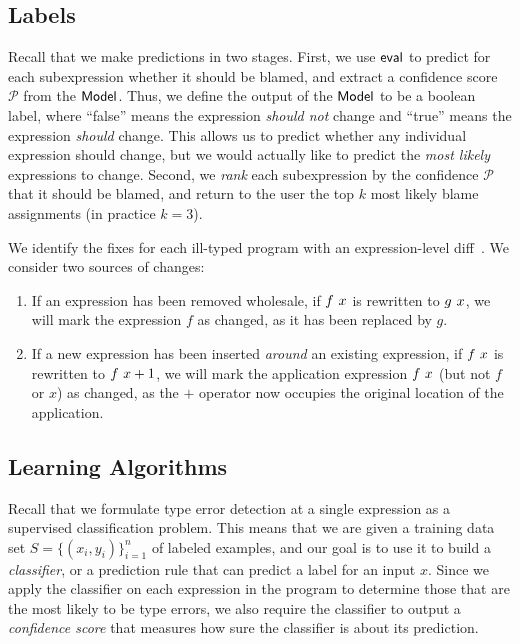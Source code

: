 \subsection{Labels}
\label{sec:labels}
Recall that we make predictions in two stages.
%
First, we use $\mathsf{eval}$ to predict for each subexpression whether it
should be blamed, and extract a confidence score $\mathcal{P}$ from the
$\mathsf{Model}$.
%
Thus, we define the output of the $\mathsf{Model}$ to be a boolean label, where
``false'' means the expression \emph{should not} change and ``true''
means the expression \emph{should} change.
%
This allows us to predict whether any individual expression should
change, but we would actually like to predict the \emph{most likely}
expressions to change.
%
Second, we \emph{rank} each subexpression by the confidence $\mathcal{P}$
that it should be blamed, and return to the user the top $k$
most likely blame assignments (in practice $k=3$).


We identify the fixes for each ill-typed program with an
expression-level diff~\citep{Lempsink2009-xf}.
%
We consider two sources of changes:
%
\begin{enumerate}
\item If an expression has been removed wholesale, \eg if $f\ x$
  is rewritten to $g\ x$, we will mark the expression $f$ as
  changed, as it has been replaced by $g$.
\item If a new expression has been inserted \emph{around} an existing
  expression, \eg if $f\ x$ is rewritten to
  $f\ x + 1$, we will mark the application expression
  $f\ x$ (but not $f$ or $x$) as changed, as the $+$ operator now
  occupies the original location of the application.
\end{enumerate}

\subsection{Learning Algorithms}
\label{sec:models}
\lstDeleteShortInline{|} %

Recall that we formulate type error detection at a single expression as a supervised classification problem. This means that we are given a training data set $S = \{ (x_i, y_i) \}_{i=1}^n$ of labeled examples, and our goal is to use it to build a {\em{classifier}}, or a prediction rule that can predict a label for an input $x$. Since we apply the classifier on each expression in the program to determine those that are the most likely to be type errors, we also require the classifier to output a {\em{confidence score}} that measures how sure the classifier is about its prediction.


